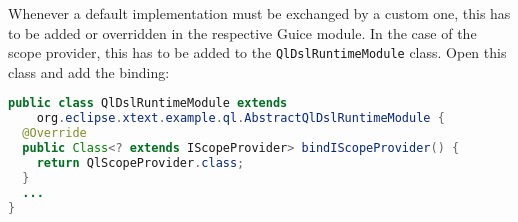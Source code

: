 Whenever a default implementation must be exchanged by a custom one, this has to be added or overridden in the respective Guice module.
In the case of the scope provider, this has to be added to the \texttt{QlDslRuntimeModule} class. Open this class and add the binding:

\begin{lstlisting}[language=Java]
public class QlDslRuntimeModule extends
    org.eclipse.xtext.example.ql.AbstractQlDslRuntimeModule {
  @Override
  public Class<? extends IScopeProvider> bindIScopeProvider() {
    return QlScopeProvider.class;
  }
  ...
}
\end{lstlisting}

